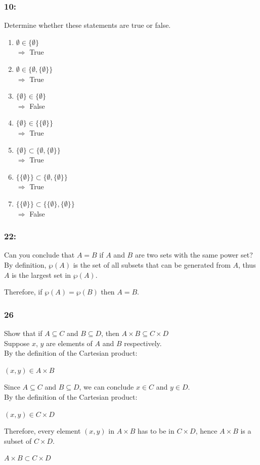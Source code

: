 \documentclass[12pt,en,a4paper]{article}
\begin{document}
	\subsubsection*{10:}
	Determine whether these statements are true or false.
	\begin{enumerate}[label=\textbf{$\alph*$)}]
		\item $\emptyset\in\{\emptyset\}$\\
		$\Rightarrow$ True
		\item $\emptyset\in\{\emptyset,\{\emptyset\}\}$\\
		$\Rightarrow$ True
		\item $\{\emptyset\}\in\{\emptyset\}$\\
		$\Rightarrow$ False
		\item $\{\emptyset\}\in\{\{\emptyset\}\}$\\
		$\Rightarrow$ True
		\item $\{\emptyset\}\subset\{\emptyset,\{\emptyset\}\}$\\
		$\Rightarrow$ True
		\item $\{\{\emptyset\}\}\subset\{\emptyset,\{\emptyset\}\}$\\
		$\Rightarrow$ True
		\item $\{\{\emptyset\}\}\subset\{\{\emptyset\},\{\emptyset\}\}$\\
		$\Rightarrow$ False
		\end{enumerate}
	\subsubsection*{22:}
	Can you conclude that $A=B$ if $A$ and $B$ are two sets with the same power set?\\
	
	By definition, $\wp(A)$ is the set of all subsets that can be generated from $A$, thus $A$ is the largest set in $\wp(A)$.
	
	Therefore, if $\wp(A)=\wp(B)$ then $A=B$.
	\subsubsection*{26}
	Show that if $A\subseteq C$ and $B\subseteq D$, then $A\times B\subseteq C\times D$\\
	
	Suppose $x$, $y$ are elements of $A$ and $B$ respectively.\\
	By the definition of the Cartesian product:
	\begin{center}
		$(x,y)\in A\times B$
	\end{center}
	Since $A\subseteq C$ and $B\subseteq D$, we can conclude $x\in C$ and $y\in D$.\\
	By the definition of the Cartesian product:
	\begin{center}
		$(x,y)\in C\times D$
	\end{center}
	Therefore, every element $(x,y)$ in $A\times B$ has to be in $C\times D$, hence $A\times B$ is a subset of $C\times D$.
	\begin{center}
		$A\times B\subset C\times D$
	\end{center}
\end{document}
